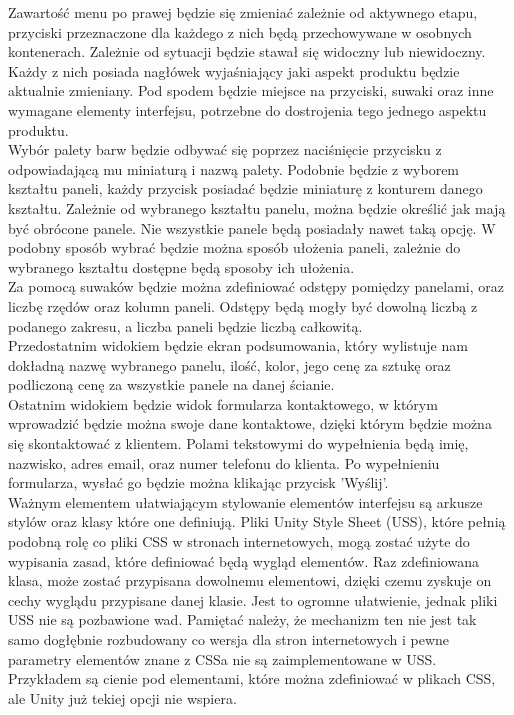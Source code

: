 \documentclass{article} %
\begin{document}
            Zawartość menu po prawej będzie się zmieniać zależnie od aktywnego etapu, przyciski przeznaczone dla każdego z nich będą przechowywane w osobnych kontenerach. Zależnie od sytuacji będzie stawał się widoczny lub niewidoczny. Każdy z nich posiada nagłówek wyjaśniający jaki aspekt produktu będzie aktualnie zmieniany. Pod spodem będzie miejsce na przyciski, suwaki oraz inne wymagane elementy interfejsu, potrzebne do dostrojenia tego jednego aspektu produktu.
            \\
            
            Wybór palety barw będzie odbywać się poprzez naciśnięcie przycisku z odpowiadającą mu miniaturą i nazwą palety. Podobnie będzie z wyborem kształtu paneli, każdy przycisk posiadać będzie miniaturę z konturem danego kształtu. Zależnie od wybranego kształtu panelu, można będzie określić jak mają być obrócone panele. Nie wszystkie panele będą posiadały nawet taką opcję. W podobny sposób wybrać będzie można sposób ułożenia paneli, zależnie do wybranego kształtu dostępne będą sposoby ich ułożenia.
            \\
            
            Za pomocą suwaków będzie można zdefiniować odstępy pomiędzy panelami, oraz liczbę rzędów oraz kolumn paneli. Odstępy będą mogły być dowolną liczbą z podanego zakresu, a liczba paneli będzie liczbą całkowitą.
            \\
            
            Przedostatnim widokiem będzie ekran podsumowania, który wylistuje nam dokładną nazwę wybranego panelu, ilość, kolor, jego cenę za sztukę oraz podliczoną cenę za wszystkie panele na danej ścianie.
            \\
            
            Ostatnim widokiem będzie widok formularza kontaktowego, w którym wprowadzić będzie można swoje dane kontaktowe, dzięki którym będzie można się skontaktować z klientem. Polami tekstowymi do wypełnienia będą imię, nazwisko, adres email, oraz numer telefonu do klienta. Po wypełnieniu formularza, wysłać go będzie można klikając przycisk 'Wyślij'.
            \\
            
            Ważnym elementem ułatwiającym stylowanie elementów interfejsu są arkusze stylów oraz klasy które one definiują. Pliki Unity 
            Style Sheet (USS), które pełnią podobną rolę co pliki CSS w stronach internetowych, mogą zostać użyte do wypisania zasad, które definiować będą wygląd elementów. Raz zdefiniowana klasa, może zostać przypisana dowolnemu elementowi, dzięki czemu zyskuje on cechy wyglądu przypisane danej klasie. Jest to ogromne ułatwienie, jednak pliki USS nie są pozbawione wad. Pamiętać należy, że mechanizm ten nie jest tak samo dogłębnie rozbudowany co wersja dla stron internetowych i pewne parametry elementów znane z CSSa nie są zaimplementowane w USS. Przykładem są cienie pod elementami, które można zdefiniować w plikach CSS, ale Unity już tekiej opcji nie wspiera.
            \\
            
\end{document}
